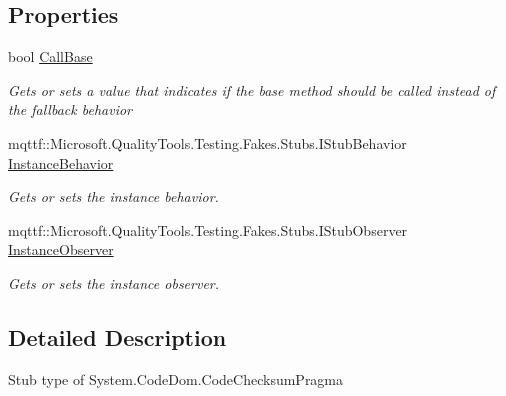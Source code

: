 \subsection*{Properties}
\begin{DoxyCompactItemize}
\item 
bool \hyperlink{class_system_1_1_code_dom_1_1_fakes_1_1_stub_code_checksum_pragma_a745538411234f3c1e6ff8641ec39c2e3}{Call\-Base}
\begin{DoxyCompactList}\small\item\em Gets or sets a value that indicates if the base method should be called instead of the fallback behavior\end{DoxyCompactList}\item 
mqttf\-::\-Microsoft.\-Quality\-Tools.\-Testing.\-Fakes.\-Stubs.\-I\-Stub\-Behavior \hyperlink{class_system_1_1_code_dom_1_1_fakes_1_1_stub_code_checksum_pragma_a7233e2d8b1ddf9820bc8a73f99877997}{Instance\-Behavior}
\begin{DoxyCompactList}\small\item\em Gets or sets the instance behavior.\end{DoxyCompactList}\item 
mqttf\-::\-Microsoft.\-Quality\-Tools.\-Testing.\-Fakes.\-Stubs.\-I\-Stub\-Observer \hyperlink{class_system_1_1_code_dom_1_1_fakes_1_1_stub_code_checksum_pragma_a57d0eafec11a82fc5b1f64454279d8fc}{Instance\-Observer}
\begin{DoxyCompactList}\small\item\em Gets or sets the instance observer.\end{DoxyCompactList}\end{DoxyCompactItemize}


\subsection{Detailed Description}
Stub type of System.\-Code\-Dom.\-Code\-Checksum\-Pragma




